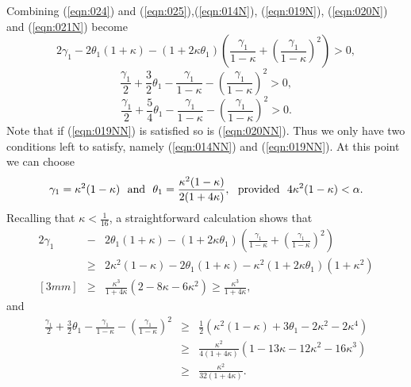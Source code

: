 \documentclass[12pt,leqno]{article}
\theoremstyle{plain}
\numberwithin{equation}{section}
\begin{document}
Combining (\ref{eqn:024}) and (\ref{eqn:025}),(\ref{eqn:014N}),
(\ref{eqn:019N}), (\ref{eqn:020N}) and (\ref{eqn:021N}) become
\begin{equation}\label{eqn:014NN}
2\gamma_1-2\theta_1(1+\kappa)-(1+2\kappa\theta_1)
\left( \frac{\gamma_1}{1-\kappa}
+\left(\frac{\gamma_1}{1-\kappa}\right)^2\right)>0,
\end{equation}
\begin{equation}\label{eqn:019NN}
\frac{\gamma_1}{2}+\frac{3}{2}\theta_1- \frac{\gamma_1}{1-\kappa}
-\left(\frac{\gamma_1}{1-\kappa}\right)^2>0,
\end{equation}
\begin{equation}\label{eqn:020NN}
\frac{\gamma_1}{2}+\frac{5}{4}\theta_1-
 \frac{\gamma_1}{1-\kappa}
-\left(\frac{\gamma_1}{1-\kappa}\right)^2>0.
\end{equation}
Note that if (\ref{eqn:019NN}) is satisfied so is (\ref{eqn:020NN}). Thus we only have two conditions
left to satisfy, namely (\ref{eqn:014NN}) and (\ref{eqn:019NN}). At this point we can choose
\begin{equation}\label{eqn:027}
\gamma_1=\kappa^2(1-\kappa) \ \hbox{ and }\ \theta_1=\frac{\kappa^2(1-\kappa)}{2(1+4\kappa)},\
\hbox{ provided }\ 4\kappa^2(1-\kappa)<\alpha.
\end{equation}
Recalling that $\kappa<\frac{1}{16}$, a straightforward calculation shows that
\begin{eqnarray}\label{eqn:028}
2\gamma_1 & - & 2\theta_1(1+\kappa)-(1+2\kappa\theta_1)
\left( \frac{\gamma_1}{1-\kappa}
+\left(\frac{\gamma_1}{1-\kappa}\right)^2\right)\\[3mm]
& \ge & 2\kappa^2(1-\kappa)-2\theta_1(1+\kappa)-\kappa^2(1+2\kappa\theta_1)(1+\kappa^2) \nonumber\\
[3mm]
& \ge & \frac{\kappa^3}{1+4\kappa}(2-8\kappa-6\kappa^2)\ge \frac{\kappa^3}{1+4\kappa},\nonumber
\end{eqnarray}
and
\begin{eqnarray}\label{eqn:029}
\frac{\gamma_1}{2}+\frac{3}{2}\theta_1- \frac{\gamma_1}{1-\kappa}
-\left(\frac{\gamma_1}{1-\kappa}\right)^2 &\ge & \frac{1}{2}\left( \kappa^2(1-\kappa) +3\theta_1-
2\kappa^2-2\kappa^4\right)\\[3mm]
&\ge& \frac{\kappa^2}{4(1+4\kappa)}\left(1-13\kappa-12\kappa^2-16\kappa^3\right)\nonumber\\[3mm]
&\ge &\frac{\kappa^2}{32(1+4\kappa)}.\nonumber
\end{eqnarray}
\end{document}
